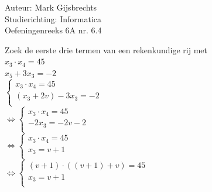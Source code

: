 \documentclass[a4paper]{article}
\begin{document}
\noindent \large Auteur: Mark Gijsbrechts \\
\noindent \large Studierichting: Informatica\\
\noindent \large Oefeningenreeks 6A nr. 6.4\\

\medskip

\normalsize



Zoek de eerste drie termen van een rekenkundige rij met \\

$ x_{3} \cdot x_{4} = 45 $ \\

$ x_{5} + 3x_{3} = -2 $ \\


$ \left\{
\begin{array}{l}
    x_{3} \cdot x_{4} = 45 \\
	
    \left( x_{3} + 2v \right) - 3x_{3} = -2 \\
	
\end{array}
\right.$ \\

$\Leftrightarrow \left\{
\begin{array}{l}
    x_{3} \cdot x_{4} = 45 \\
	
    -2x_{3} = -2v - 2 \\
	
\end{array}
\right.$ \\

$\Leftrightarrow \left\{
\begin{array}{l}
    x_{3} \cdot x_{4} = 45 \\
	
    x_{3} = v + 1 \\
	
\end{array}
\right.$ \\

$\Leftrightarrow \left\{
\begin{array}{l}
    \left( v + 1 \right) \cdot \left( \left( v + 1 \right) + v \right) = 45 \\
	
    x_{3} = v + 1 \\
	
\end{array}
\right.$ \\
\end{document}
